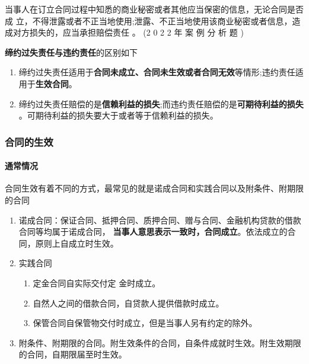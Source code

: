 \documentclass[UTF8,12pt]{ctexart}
\numberwithin{equation}{section} %
\numberwithin{figure}{section}
\numberwithin{table}{section}
\begin{document}
	当事人在订立合同过程中知悉的商业秘密或者其他应当保密的信息，无论合同是否成 立，不得泄露或者不正当地使用;泄露、不正当地使用该商业秘密或者信息，造成对方损失的，应当承担赔偿责任 。 (2 0 2 2 年 案 例 分 析 题 )
	
	\textbf{缔约过失责任与违约责任}的区别如下 
	\begin{enumerate}
		\item 缔约过失责任适用于\textbf{合同未成立、合同未生效或者合同无效}等情形;违约责任适用于\textbf{生效合同}。 
		
		\item 缔约过失责任赔偿的是\textbf{信赖利益的损失};而违约责任赔偿的是\textbf{可期待利益的损失 }。可期待利益的损失要大于或者等于信赖利益的损失。
	\end{enumerate}
	
	
	\subsubsection{合同的生效}
	\paragraph{通常情况}
	合同生效有着不同的方式，最常见的就是诺成合同和实践合同以及附条件、附期限的合同
	\begin{enumerate}
		\item 诺成合同：保证合同、抵押合同、质押合同、赠与合同、金融机构贷款的借款合同等均属于诺成合同， \textbf{当事人意思表示一致时，合同成立}。依法成立的合同，原则上自成立时生效。
		
		\item 实践合同
		\begin{enumerate}
			\item 定金合同自实际交付定 金时成立。 
			
			\item 自然人之间的借款合同，自贷款人提供借款时成立。 
			
			\item 保管合同自保管物交付时成立，但是当事人另有约定的除外。
		\end{enumerate}
		
		\item 附条件、附期限的合同。附生效条件的合同，自条件成就时生效。附生效期限的合同，自期限届至时生效。
	\end{enumerate}
	
\end{document}
